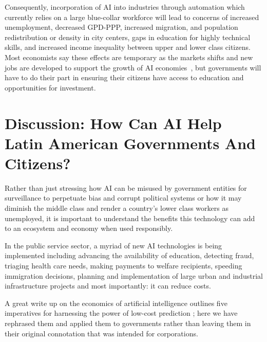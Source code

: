 \documentclass[conference]{IEEEtran}
\begin{document}
Consequently, incorporation of AI into industries through automation which currently relies on a large blue-collar workforce will lead to concerns of increased unemployment, decreased GPD-PPP, increased migration, and population redistribution or density in city centers, gaps in education for highly technical skills, and increased income inequality between upper and lower class citizens. Most economists say these effects are temporary as the markets shifts and new jobs are developed to support the growth of AI economies~\cite{manyika2017future,intelligence2016automation,manyika2017jobs}, but governments will have to do their part in ensuring their citizens have access to education and opportunities for investment.


\section{Discussion: How Can AI Help Latin American Governments And Citizens?}

Rather than just stressing how AI can be misused by government entities for surveillance to perpetuate bias and corrupt political systems or how it may diminish the middle class and render a country's lower class workers as unemployed, it is important to understand the benefits this technology can add to an ecosystem and economy when used responsibly.

In the public service sector, a myriad of new AI technologies is being implemented including advancing the availability of education, detecting fraud, triaging health care needs, making payments to welfare recipients, speeding immigration decisions, planning and implementation of large urban and industrial infrastructure projects and most importantly: it can reduce costs.

A great write up on the economics of artificial intelligence outlines five imperatives for harnessing the power of low-cost prediction \cite{agrawal2018economics}; here we have rephrased them and applied them to governments rather than leaving them in their original connotation that was intended for corporations. 
\end{document}
